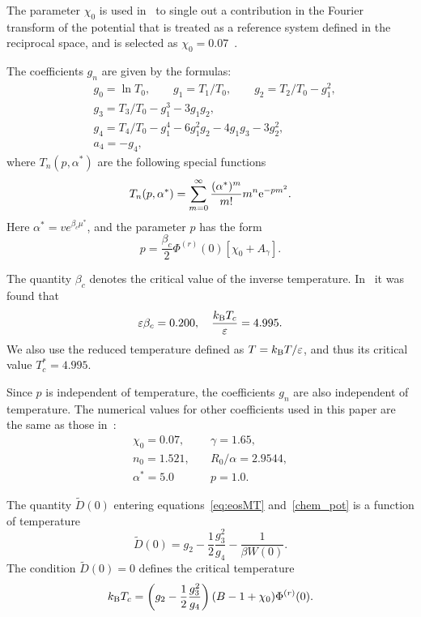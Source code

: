 The parameter $\chi_0$ is used in~\cite{KozlovskiiDobush2020} to single out a contribution in the Fourier transform of the potential that is treated as a reference system defined in the reciprocal space, and is selected as $\chi_0 = 0.07$~\cite[see Eq.(24)]{KozlovskiiDobush2020}.

The coefficients $g_n$ are given by the formulas:
\begin{align}
	& g_0 = \ln T_0, \qquad g_1 = T_1/T_0, \qquad g_2 = T_2/T_0 - g_1^2,  
	\nonumber \\
	& g_3 = T_3/T_0 - g_1^3 - 3g_1 g_2, 
	\nonumber\\
	& g_4 = T_4/T_0 - g_1^4 - 6 g_1^2 g_2 - 4 g_1 g_3 - 3 g_2^2, 
	\nonumber\\
	& a_4 = -g_4,
\end{align}
where $T_n(p,\alpha^*)$ are the following special functions
\begin{equation}
	T_n(p,\alpha^*) = \sum_{m=0}^{\infty} \frac{(\alpha^*)^m}{m!} m^n {\rm e}^{-pm^2}.
\end{equation}
Here $\alpha^*=v e^{\beta_c\mu^*}$, and the parameter $p$ has the form
\begin{equation}
	p = \frac{\beta_c}{2} \Phi^{(r)}(0) [\chi_0 + A_\gamma].
\end{equation} 

The quantity $\beta_c$ denotes the critical value of the inverse temperature. In~\cite[see Eq.(31)]{KozlovskiiDobush2020} it was found that
\begin{equation*}
	\varepsilon\beta_c = 0.200, \quad \frac{k_{\rm B} T_c}{\varepsilon} = 4.995.
\end{equation*}
We also use the reduced temperature defined as $T = k_{\rm B}T/\varepsilon$, and thus its critical value $T^*_c = 4.995.$

Since $p$ is independent of temperature, the coefficients $g_n$ are also independent of temperature. The numerical values for other coefficients used in this paper are the same as those in~\cite[see Eqs.(5), (23), and (24)]{KozlovskiiDobush2020}:
\begin{eqnarray}
	\label{params}
	\chi_0 = 0.07, & \quad \gamma = 1.65, \nonumber\\
	n_0 = 1.521, & \quad R_0/\alpha = 2.9544, \nonumber\\
	\alpha^* = 5.0 & \quad p = 1.0.
\end{eqnarray}

The quantity $\tilde D(0)$ entering equations~\eqref{eq:eosMT} and~\eqref{chem_pot} is a function of temperature
\begin{equation}
	\label{def:D0}
	\tilde D(0) = g_2 - \frac{1}{2} \frac{g_3^2}{g_4} - \frac{1}{\beta W(0)}.
\end{equation}
The condition $\tilde{D}(0) = 0$ defines the critical temperature~\cite[see Eq.(31)]{KozlovskiiDobush2020}
\begin{equation}
	k_{\rm B}T_c = \left(g_2 - \frac{1}{2} \frac{g_3^2}{g_4} \right) (B - 1 + \chi_0) \Phi^{(r)}(0).
\end{equation}  

